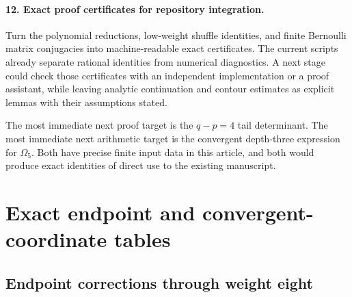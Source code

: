\documentclass[11pt,a4paper]{article}
\numberwithin{equation}{section}
\theoremstyle{definition}
\theoremstyle{remark}
\begin{document}
\paragraph{12. Exact proof certificates for repository integration.}
Turn the polynomial reductions, low-weight shuffle identities, and
finite Bernoulli matrix conjugacies into machine-readable exact
certificates.  The current scripts already separate rational
identities from numerical diagnostics.  A next stage could check
those certificates with an independent implementation or a proof
assistant, while leaving analytic continuation and contour estimates
as explicit lemmas with their assumptions stated.

The most immediate next proof target is the $q-p=4$ tail determinant.
The most immediate next arithmetic target is the convergent
depth-three expression for $\Omega_5$.  Both have precise finite
input data in this article, and both would produce exact identities
of direct use to the existing manuscript.


\appendix

\section{Exact endpoint and convergent-coordinate tables}
\label{tables:sec}

\subsection{Endpoint corrections through weight eight}
\label{tables:boundaries}
\end{document}
